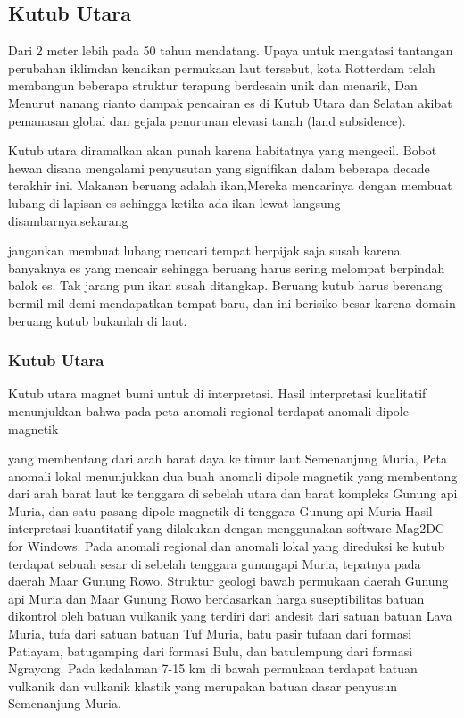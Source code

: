 \subsection{Kutub Utara}	
Dari 2 meter lebih pada 50 tahun 
	mendatang. Upaya untuk mengatasi tantangan perubahan iklimdan kenaikan permukaan laut tersebut, kota Rotterdam telah membangun beberapa struktur terapung 
	berdesain unik dan menarik, Dan Menurut nanang rianto dampak pencairan es di Kutub Utara dan Selatan akibat pemanasan global dan gejala penurunan elevasi
	tanah (land subsidence).
	
		Kutub utara diramalkan akan punah karena habitatnya yang mengecil. Bobot hewan disana mengalami penyusutan yang signiﬁkan dalam beberapa decade terakhir ini. Makanan beruang adalah ikan,Mereka mencarinya dengan membuat lubang di lapisan es sehingga ketika ada ikan lewat langsung disambarnya.sekarang 

	jangankan membuat lubang mencari tempat berpijak saja susah karena banyaknya es yang mencair sehingga beruang harus sering melompat berpindah balok es.
	Tak jarang pun ikan susah ditangkap. Beruang kutub harus berenang bermil-mil demi mendapatkan tempat baru, dan ini berisiko besar karena domain beruang
	kutub bukanlah di laut.
	
	

\subsubsection {Kutub Utara}
		Kutub utara magnet bumi untuk di interpretasi. Hasil interpretasi kualitatif menunjukkan bahwa pada peta anomali regional terdapat anomali dipole magnetik

	yang membentang dari arah barat daya ke timur laut Semenanjung Muria, Peta anomali lokal menunjukkan dua buah anomali dipole magnetik yang membentang dari 
	arah barat laut ke tenggara di sebelah utara dan barat kompleks Gunung api Muria, dan satu pasang dipole magnetik di tenggara Gunung api Muria Hasil 
	interpretasi kuantitatif yang dilakukan dengan menggunakan software Mag2DC for Windows. Pada anomali regional dan anomali lokal yang direduksi ke kutub 
	terdapat sebuah sesar di sebelah tenggara gunungapi Muria, tepatnya pada daerah Maar Gunung Rowo. Struktur geologi bawah permukaan daerah Gunung api Muria 
	dan Maar Gunung Rowo berdasarkan harga suseptibilitas batuan dikontrol oleh batuan vulkanik yang terdiri dari andesit dari satuan batuan Lava Muria, tufa 
	dari satuan batuan Tuf Muria, batu pasir tufaan dari formasi Patiayam, batugamping dari formasi Bulu, dan batulempung dari formasi Ngrayong. Pada kedalaman
	7-15 km di bawah permukaan terdapat batuan vulkanik dan vulkanik klastik yang merupakan batuan dasar penyusun Semenanjung Muria.
	
